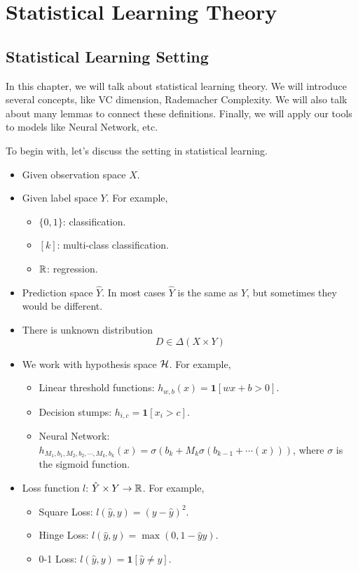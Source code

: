 \documentclass[../main.tex]{subfiles}
\begin{document}
	\chapter{Statistical Learning Theory}
	
	\section{Statistical Learning Setting}
	In this chapter, we will talk about statistical learning theory. We will introduce several concepts, like VC dimension, Rademacher Complexity. We will also talk about many lemmas to connect these definitions. Finally, we will apply our tools to models like Neural Network, etc.
	
	To begin with, let's discuss the setting in statistical learning.
	
	\begin{itemize}
		\item Given observation space $X$.
		\item Given label space $Y$. For example,
			\begin{itemize}
				\item $\{0,1\}$: classification.
				\item $[k]$: multi-class classification.
				\item $\mathbb{R}$: regression.
			\end{itemize}
		\item Prediction space $\hat{Y}$. In most cases $\hat{Y}$ is the same as $Y$, but sometimes they would be different.
		\item There is unknown distribution
		\begin{equation*}
		D\in \Delta(X\times Y)
		\end{equation*}
		\item We work with hypothesis space $\mathcal{H}$. For example,
			\begin{itemize}
				\item Linear threshold functions: $h_{w,b}(x) = \mathbf{1}[wx + b > 0]$.
				\item Decision stumps: $h_{i,c} = \mathbf{1}[x_i > c]$.
				\item Neural Network: $h_{M_1,b_1,M_2,b_2,\cdots,M_k,b_k}(x) = \sigma(b_k + M_k\sigma(b_{k-1} + \cdots (x)))$, where $\sigma$ is the sigmoid function.
			\end{itemize}
		\item Loss function $l$: $\hat{Y} \times Y \to \mathbb{R}$. For example,
		\begin{itemize}
			\item Square Loss: $l(\hat{y},y) = (y - \hat{y})^2$.
			\item Hinge Loss: $l(\hat{y},y) = \max(0, 1 - \hat{y}y)$.
			\item 0-1 Loss: $l(\hat{y},y) = \mathbf{1}[\hat{y} \neq y]$.
		\end{itemize}
	\end{itemize}
\end{document}
